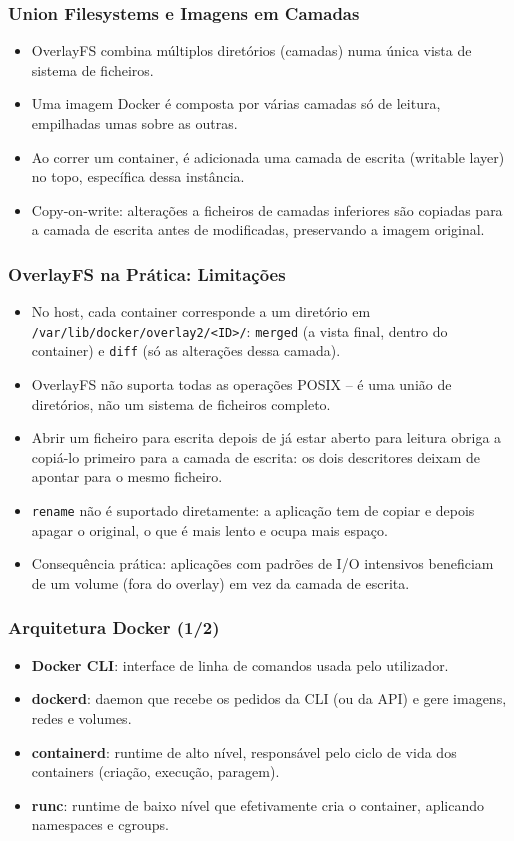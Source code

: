 \documentclass[aspectratio=169]{beamer}
\begin{document}
\begin{frame}
\frametitle{Union Filesystems e Imagens em Camadas}
\begin{itemize}
    \setlength\itemsep{0.4cm}
    \item OverlayFS combina múltiplos diretórios (camadas) numa única vista de sistema de ficheiros.
    \item Uma imagem Docker é composta por várias camadas só de leitura, empilhadas umas sobre as outras.
    \item Ao correr um container, é adicionada uma camada de escrita (writable layer) no topo, específica dessa instância.
    \item Copy-on-write: alterações a ficheiros de camadas inferiores são copiadas para a camada de escrita antes de modificadas, preservando a imagem original.
\end{itemize}
\end{frame}

\begin{frame}
\frametitle{OverlayFS na Prática: Limitações}
\begin{itemize}
    \setlength\itemsep{0.4cm}
    \item No host, cada container corresponde a um diretório em \texttt{/var/lib/docker/overlay2/<ID>/}: \texttt{merged} (a vista final, dentro do container) e \texttt{diff} (só as alterações dessa camada).
    \item OverlayFS não suporta todas as operações POSIX -- é uma união de diretórios, não um sistema de ficheiros completo.
    \item Abrir um ficheiro para escrita depois de já estar aberto para leitura obriga a copiá-lo primeiro para a camada de escrita: os dois descritores deixam de apontar para o mesmo ficheiro.
    \item \texttt{rename} não é suportado diretamente: a aplicação tem de copiar e depois apagar o original, o que é mais lento e ocupa mais espaço.
    \item Consequência prática: aplicações com padrões de I/O intensivos beneficiam de um volume (fora do overlay) em vez da camada de escrita.
\end{itemize}
\end{frame}

\begin{frame}
\frametitle{Arquitetura Docker \textcolor{NudeTaupe}{\small(1/2)}}
\begin{itemize}
    \setlength\itemsep{0.4cm}
    \item \textbf{Docker CLI}: interface de linha de comandos usada pelo utilizador.
    \item \textbf{dockerd}: daemon que recebe os pedidos da CLI (ou da API) e gere imagens, redes e volumes.
    \item \textbf{containerd}: runtime de alto nível, responsável pelo ciclo de vida dos containers (criação, execução, paragem).
    \item \textbf{runc}: runtime de baixo nível que efetivamente cria o container, aplicando namespaces e cgroups.
\end{itemize}
\end{frame}
\end{document}
